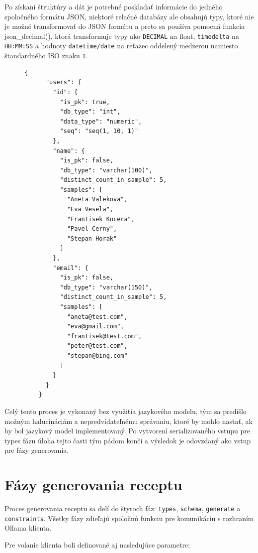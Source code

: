 Po získaní štruktúry a dát je potrebné poskladať informácie do jedného spoločného formátu JSON, niektoré relačné databázy ale obsahujú typy, ktoré nie je možné transformovať do JSON formátu a preto sa používa pomocná funkcia json\_decimal(), ktorá transformuje typy ako \texttt{DECIMAL} na float, \texttt{timedelta} na \texttt{HH:MM:SS} a hodnoty \texttt{datetime/date} na reťazec oddelený medzerou namiesto štandardného ISO znaku \texttt{T}.
\begin{figure}[H]
    \centering
    \begin{lstlisting}[caption={Príklad serializovaného vstupu}, label={lst:json}, frame=single, linewidth=0.9\textwidth, xleftmargin=0.09\textwidth]
    {
      "users": {
        "id": {
          "is_pk": true,
          "db_type": "int",
          "data_type": "numeric",
          "seq": "seq(1, 10, 1)"
        },
        "name": {
          "is_pk": false,
          "db_type": "varchar(100)",
          "distinct_count_in_sample": 5,
          "samples": [
            "Aneta Valekova",
            "Eva Vesela",
            "Frantisek Kucera",
            "Pavel Cerny",
            "Stepan Horak"
          ]
        },
        "email": {
          "is_pk": false,
          "db_type": "varchar(150)",
          "distinct_count_in_sample": 5,
          "samples": [
            "aneta@test.com",
            "eva@gmail.com",
            "frantisek@test.com",
            "peter@test.com",
            "stepan@bing.com"
          ]
        }
      }
    }
\end{lstlisting}
\end{figure}

Celý tento proces je vykonaný bez využitia jazykového modelu, tým sa predišlo možným halucináciám a nepredvídateľnému správaniu, ktoré by mohlo nastať, ak by bol jazykový model implementovaný. Po vytvorení serializovaného vstupu pre types fázu úloha tejto časti tým pádom končí a výsledok je odovzdaný ako vstup pre fázy generovania.

\section{Fázy generovania receptu}
\label{sub:fazy_generovania_receptu}

Proces generovania receptu sa delí do štyroch fáz: \texttt{types}, \texttt{schema}, \texttt{generate} a \texttt{constraints}. Všetky fázy zdieľajú spoločnú funkciu pre komunikáciu s rozhraním Ollama klienta.

Pre volanie klienta boli definované aj nasledujúce parametre:

